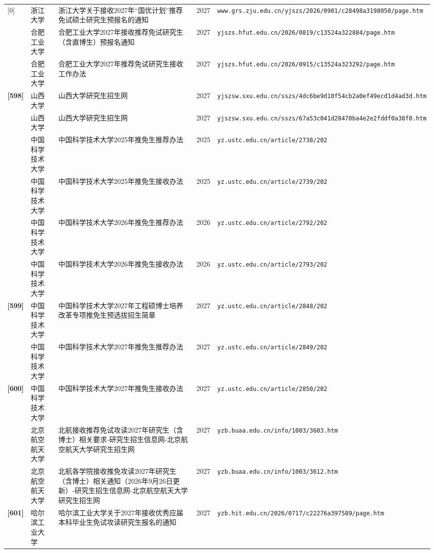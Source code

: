 {\begin{longtable}{@{}p{1.15cm}p{2.9cm}p{6.3cm}p{0.85cm}p{5.0cm}@{}}
[0] & 浙江大学 & 浙江大学关于接收2027年“国优计划”推荐免试硕士研究生预报名的通知 & 2027 & \texttt{www.grs.zju.edu.cn/yjszs/2026/0901/c28498a3198050/page.htm} \\
[0] & 合肥工业大学 & 合肥工业大学2027年接收推荐免试研究生（含直博生）预报名通知 & 2027 & \texttt{yjszs.hfut.edu.cn/2026/0819/c13524a322884/page.htm} \\
[0] & 合肥工业大学 & 合肥工业大学2027年推荐免试研究生接收工作办法 & 2027 & \texttt{yjszs.hfut.edu.cn/2026/0915/c13524a323292/page.htm} \\
\textbf{[598]} & 山西大学 & 山西大学研究生招生网 & 2027 & \texttt{yjszsw.sxu.edu.cn/sszs/4dc6be9d10f54cb2a0ef49ecd1d4ad3d.htm} \\
[0] & 山西大学 & 山西大学研究生招生网 & 2027 & \texttt{yjszsw.sxu.edu.cn/sszs/67a53c041d28470ba4e2e2fddf0a38f0.htm} \\
[0] & 中国科学技术大学 & 中国科学技术大学2025年推免生推荐办法 & 2025 & \texttt{yz.ustc.edu.cn/article/2738/202} \\
[0] & 中国科学技术大学 & 中国科学技术大学2025年推免生接收办法 & 2025 & \texttt{yz.ustc.edu.cn/article/2739/202} \\
[0] & 中国科学技术大学 & 中国科学技术大学2026年推免生推荐办法 & 2026 & \texttt{yz.ustc.edu.cn/article/2792/202} \\
[0] & 中国科学技术大学 & 中国科学技术大学2026年推免生接收办法 & 2026 & \texttt{yz.ustc.edu.cn/article/2793/202} \\
\textbf{[599]} & 中国科学技术大学 & 中国科学技术大学2027年工程硕博士培养改革专项推免生预选拔招生简章 & 2027 & \texttt{yz.ustc.edu.cn/article/2848/202} \\
[0] & 中国科学技术大学 & 中国科学技术大学2027年推免生推荐办法 & 2027 & \texttt{yz.ustc.edu.cn/article/2849/202} \\
\textbf{[600]} & 中国科学技术大学 & 中国科学技术大学2027年推免生接收办法 & 2027 & \texttt{yz.ustc.edu.cn/article/2850/202} \\
[0] & 北京航空航天大学 & 北航接收推荐免试攻读2027年研究生（含博士）相关要求-研究生招生信息网-北京航空航天大学研究生招生网 & 2027 & \texttt{yzb.buaa.edu.cn/info/1003/3603.htm} \\
[0] & 北京航空航天大学 & 北航各学院接收推免攻读2027年研究生（含博士）相关通知（2026年9月26日更新）-研究生招生信息网-北京航空航天大学研究生招生网 & 2027 & \texttt{yzb.buaa.edu.cn/info/1003/3612.htm} \\
\textbf{[601]} & 哈尔滨工业大学 & 哈尔滨工业大学关于2027年接收优秀应届本科毕业生免试攻读研究生报名的通知 & 2027 & \texttt{yzb.hit.edu.cn/2026/0717/c22276a397589/page.htm} \\

\end{longtable}}
